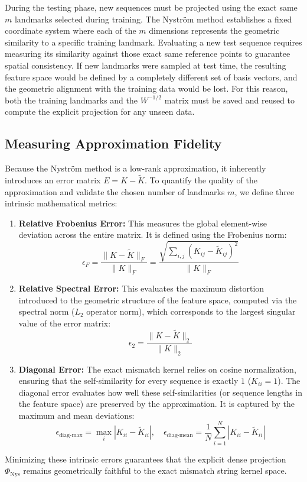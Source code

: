 During the testing phase, new sequences must be projected using the exact same $m$ landmarks selected during training. The Nystr\"{o}m method establishes a fixed coordinate system where each of the $m$ dimensions represents the geometric similarity to a specific training landmark. 
Evaluating a new test sequence requires measuring its similarity against those exact same reference points to guarantee spatial consistency. If new landmarks were sampled at test time, the resulting feature space would be defined by a completely different set of basis vectors, and the geometric alignment with the training data would be lost. 
For this reason, both the training landmarks and the $W^{-1/2}$ matrix must be saved and reused to compute the explicit projection for any unseen data.

\subsection{Measuring Approximation Fidelity}\label{sec:nystrom-metrics-theory}

Because the Nystr\"{o}m method is a low-rank approximation, it inherently introduces an error matrix $E = K - \tilde{K}$. To quantify the quality of the approximation and validate the chosen number of landmarks $m$, we define three intrinsic mathematical metrics:

\begin{enumerate}
    \item \textbf{Relative Frobenius Error:} This measures the global element-wise deviation across the entire matrix. It is defined using the Frobenius norm:
    \begin{equation}\label{eq:frob-error}
    \epsilon_F = \frac{\|K - \tilde{K}\|_F}{\|K\|_F} = \frac{\sqrt{\sum_{i,j} (K_{ij} - \tilde{K}_{ij})^2}}{\|K\|_F}
    \end{equation}

    \item \textbf{Relative Spectral Error:} This evaluates the maximum distortion introduced to the geometric structure of the feature space, computed via the spectral norm ($L_2$ operator norm), which corresponds to the largest singular value of the error matrix:
    \begin{equation}\label{eq:spectral-error}
    \epsilon_2 = \frac{\|K - \tilde{K}\|_2}{\|K\|_2}
    \end{equation}

    \item \textbf{Diagonal Error:} The exact mismatch kernel relies on cosine normalization, ensuring that the self-similarity for every sequence is exactly $1$ ($K_{ii} = 1$). The diagonal error evaluates how well these self-similarities (or sequence lengths in the feature space) are preserved by the approximation. It is captured by the maximum and mean deviations:
    \begin{equation}\label{eq:diag-error}
    \epsilon_{\text{diag-max}} = \max_i |K_{ii} - \tilde{K}_{ii}|, \quad \epsilon_{\text{diag-mean}} = \frac{1}{N} \sum_{i=1}^N |K_{ii} - \tilde{K}_{ii}|
    \end{equation}
\end{enumerate}

Minimizing these intrinsic errors guarantees that the explicit dense projection $\Phi_{\text{Nys}}$ remains geometrically faithful to the exact mismatch string kernel space.